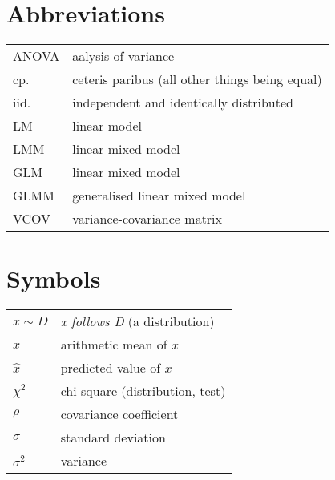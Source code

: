 
\section{Abbreviations}

\begin{tabular}{ll}
  ANOVA & aalysis of variance \\
  cp.   & ceteris paribus (all other things being equal) \\
  iid.  & independent and identically distributed \\
  LM    & linear model \\
  LMM   & linear mixed model \\
  GLM   & linear mixed model \\
  GLMM  & generalised linear mixed model \\
  VCOV  & variance-covariance matrix \\
\end{tabular}


\section{Symbols}

\begin{tabular}{lp{4.5cm}} 
  $x\sim D$         & \textit{x follows D} (a distribution) \\
  $\bar{x}$         & arithmetic mean of $x$\\
  $\hat{x}$         & predicted value of $x$\\
  $\chi^2$          & chi square (distribution, test) \\
  $\rho$            & covariance coefficient \\
  $\sigma$          & standard deviation \\
  $\sigma^2$        & variance \\ 
\end{tabular} 

